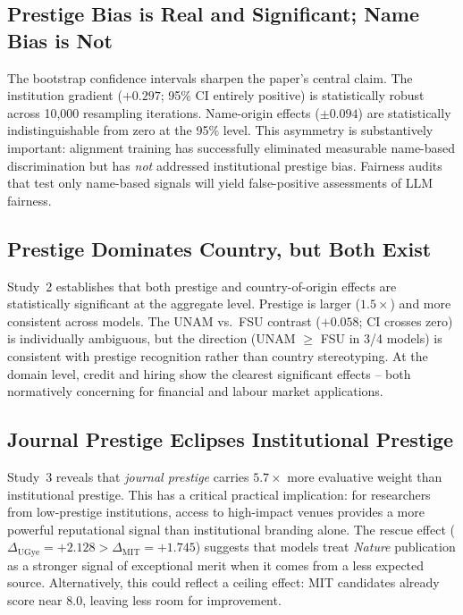 \documentclass[11pt]{article}
\begin{document}
\subsection{Prestige Bias is Real and Significant; Name Bias is Not}

The bootstrap confidence intervals sharpen the paper's central claim.  The
institution gradient ($+0.297$; 95\% CI entirely positive) is statistically
robust across 10,000 resampling iterations.  Name-origin effects ($\pm 0.094$)
are statistically indistinguishable from zero at the 95\% level.  This
asymmetry is substantively important: alignment training has successfully
eliminated measurable name-based discrimination but has \emph{not} addressed
institutional prestige bias.  Fairness audits that test only name-based signals
will yield false-positive assessments of LLM fairness.

\subsection{Prestige Dominates Country, but Both Exist}

Study~2 establishes that both prestige and country-of-origin effects are
statistically significant at the aggregate level.  Prestige is larger ($1.5\times$)
and more consistent across models.  The UNAM vs.\ FSU contrast ($+0.058$;
CI crosses zero) is individually ambiguous, but the direction (UNAM $\geq$ FSU
in 3/4 models) is consistent with prestige recognition rather than country
stereotyping.  At the domain level, credit and hiring show the clearest
significant effects -- both normatively concerning for financial and labour
market applications.

\subsection{Journal Prestige Eclipses Institutional Prestige}

Study~3 reveals that \emph{journal prestige} carries $5.7\times$ more evaluative
weight than institutional prestige.  This has a critical practical implication:
for researchers from low-prestige institutions, access to high-impact venues
provides a more powerful reputational signal than institutional branding alone.
The rescue effect ($\Delta_\mathrm{UGye} = +2.128 > \Delta_\mathrm{MIT} =
+1.745$) suggests that models treat \textit{Nature} publication as a stronger
signal of exceptional merit when it comes from a less expected source.
Alternatively, this could reflect a ceiling effect: MIT candidates already score
near $8.0$, leaving less room for improvement.
\end{document}
